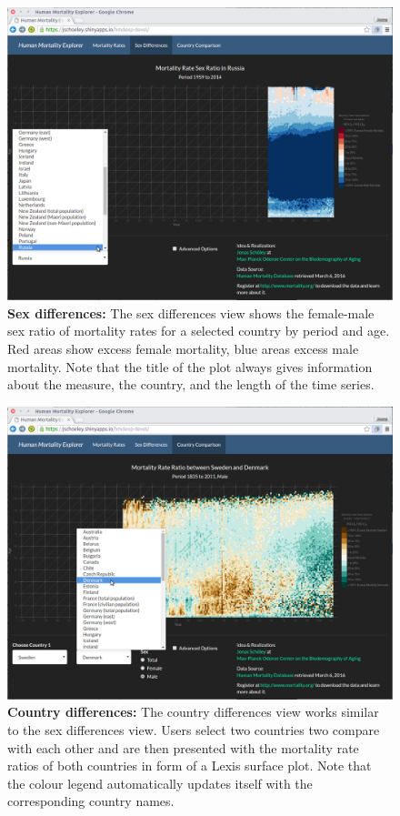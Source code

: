 \documentclass[
  12pt
]{scrartcl}
\begin{document}
\begin{figure}[ht!]\centering
  \includegraphics[width = \linewidth]{./fig/hmd_screen_mx_sex_diff.png}
  \caption*{\textbf{Sex differences:} The sex differences view shows the female-male sex ratio of mortality rates for a selected country by period and age. Red areas show excess female mortality, blue areas excess male mortality. Note that the title of the plot always gives information about the measure, the country, and the length of the time series.}
  \label{fig:mx_sex_diff}
\end{figure}

\begin{figure}[ht!]\centering
  \includegraphics[width = \linewidth]{./fig/hmd_screen_mx_cntry_diff.png}
  \caption*{\textbf{Country differences:} The country differences view works similar to the sex differences view. Users select two countries two compare with each other and are then presented with the mortality rate ratios of both countries in form of a Lexis surface plot. Note that the colour legend automatically updates itself with the corresponding country names.}
  \label{fig:mx_cntry_diff}
\end{figure}
\end{document}
